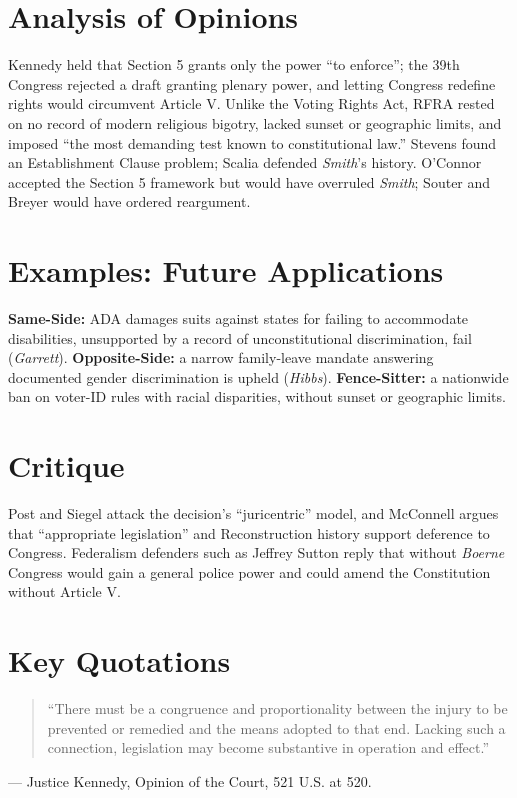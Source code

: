 \documentclass[12pt]{article}
\begin{document}
\section{Analysis of Opinions}
Kennedy held that Section 5 grants only the power ``to enforce''; the 39th Congress rejected a draft granting plenary power, and letting Congress redefine rights would circumvent Article V. Unlike the Voting Rights Act, RFRA rested on no record of modern religious bigotry, lacked sunset or geographic limits, and imposed ``the most demanding test known to constitutional law.'' Stevens found an Establishment Clause problem; Scalia defended \textit{Smith}'s history. O'Connor accepted the Section 5 framework but would have overruled \textit{Smith}; Souter and Breyer would have ordered reargument.

\section{Examples: Future Applications}
\textbf{Same-Side:} ADA damages suits against states for failing to accommodate disabilities, unsupported by a record of unconstitutional discrimination, fail (\textit{Garrett}). \textbf{Opposite-Side:} a narrow family-leave mandate answering documented gender discrimination is upheld (\textit{Hibbs}). \textbf{Fence-Sitter:} a nationwide ban on voter-ID rules with racial disparities, without sunset or geographic limits.

\section{Critique}
Post and Siegel attack the decision's ``juricentric'' model, and McConnell argues that ``appropriate legislation'' and Reconstruction history support deference to Congress. Federalism defenders such as Jeffrey Sutton reply that without \textit{Boerne} Congress would gain a general police power and could amend the Constitution without Article V.

\section{Key Quotations}
\begin{quote}
``There must be a congruence and proportionality between the injury to be prevented or remedied and the means adopted to that end. Lacking such a connection, legislation may become substantive in operation and effect.''
\end{quote}
\noindent --- Justice Kennedy, Opinion of the Court, 521 U.S. at 520.
\end{document}
